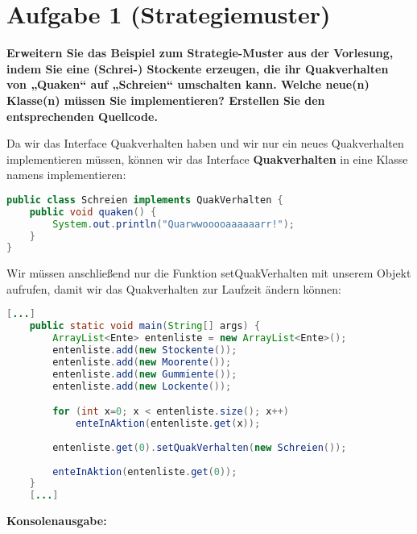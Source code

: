 \section{Aufgabe 1 (Strategiemuster)}
\textbf{Erweitern Sie das Beispiel zum Strategie-Muster aus der Vorlesung, indem Sie eine (Schrei-)
Stockente erzeugen, die ihr Quakverhalten von „Quaken“ auf „Schreien“ umschalten kann.
Welche neue(n) Klasse(n) müssen Sie implementieren?
Erstellen Sie den entsprechenden Quellcode.}

Da wir das Interface Quakverhalten haben und wir nur ein neues Quakverhalten
implementieren müssen, können wir das Interface \textbf{Quakverhalten} in eine
Klasse namens  implementieren:

\begin{lstlisting}[language=java, style=java, caption={Schreien.java},
label={lst:lst1}]
public class Schreien implements QuakVerhalten {
    public void quaken() {
        System.out.println("Quarwwooooaaaaaarr!");
    }
}
\end{lstlisting}

Wir müssen anschließend nur die Funktion setQuakVerhalten mit unserem
Objekt aufrufen, damit wir das Quakverhalten zur Laufzeit ändern können:

\begin{lstlisting}[language=java, style=java, caption={EntenSimulator.java},
label={lst:lst2}]
	[...]
    public static void main(String[] args) {
        ArrayList<Ente> entenliste = new ArrayList<Ente>();
        entenliste.add(new Stockente());
        entenliste.add(new Moorente());
        entenliste.add(new Gummiente());
        entenliste.add(new Lockente());

        for (int x=0; x < entenliste.size(); x++)
            enteInAktion(entenliste.get(x));
        
        entenliste.get(0).setQuakVerhalten(new Schreien());
        
        enteInAktion(entenliste.get(0));
    }
	[...]
\end{lstlisting}
\clearpage

\textbf{Konsolenausgabe:}

\clearpage
